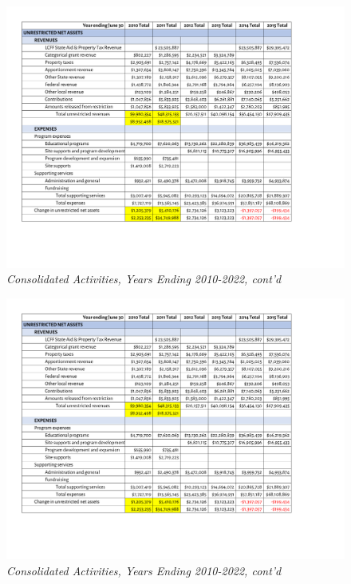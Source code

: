 \begin{figure}
  \caption*{\textit{Consolidated Activities, Years Ending 2010-2022, cont'd}} %
  \includegraphics[page=3,scale=0.9]{Consolidated_Activities_2010-2022} %
\end{figure}

\begin{figure}
  \caption*{\textit{Consolidated Activities, Years Ending 2010-2022, cont'd}} %
  \includegraphics[page=4,scale=0.9]{Consolidated_Activities_2010-2022} %
\end{figure}


